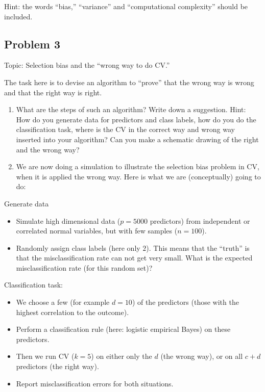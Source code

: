 \documentclass[
]{article}
\providecommand{\tightlist}{%
  \setlength{\itemsep}{0pt}\setlength{\parskip}{0pt}}
\begin{document}
Hint: the words ``bias,'' ``variance'' and ``computational complexity''
should be included.

\hypertarget{problem-3}{%
\subsection{Problem 3}\label{problem-3}}

Topic: Selection bias and the ``wrong way to do CV.''

The task here is to devise an algorithm to ``prove'' that the wrong way
is wrong and that the right way is right.

\begin{enumerate}
\def\labelenumi{\alph{enumi})}
\item
  What are the steps of such an algorithm? Write down a suggestion.
  Hint: How do you generate data for predictors and class labels, how do
  you do the classification task, where is the CV in the correct way and
  wrong way inserted into your algorithm? Can you make a schematic
  drawing of the right and the wrong way?
\item
  We are now doing a simulation to illustrate the selection bias problem
  in CV, when it is applied the wrong way. Here is what we are
  (conceptually) going to do:
\end{enumerate}

Generate data

\begin{itemize}
\item
  Simulate high dimensional data (\(p = 5000\) predictors) from
  independent or correlated normal variables, but with few samples
  (\(n = 100\)).
\item
  Randomly assign class labels (here only \(2\)). This means that the
  ``truth'' is that the misclassification rate can not get very small.
  What is the expected misclassification rate (for this random set)?
\end{itemize}

Classification task:

\begin{itemize}
\tightlist
\item
  We choose a few (for example \(d = 10\)) of the predictors (those with
  the highest correlation to the outcome).
\item
  Perform a classification rule (here: logistic empirical Bayes) on
  these predictors.
\item
  Then we run CV (\(k = 5\)) on either only the \(d\) (the wrong way),
  or on all \(c + d\) predictors (the right way).
\item
  Report misclassification errors for both situations.
\end{itemize}
\end{document}
